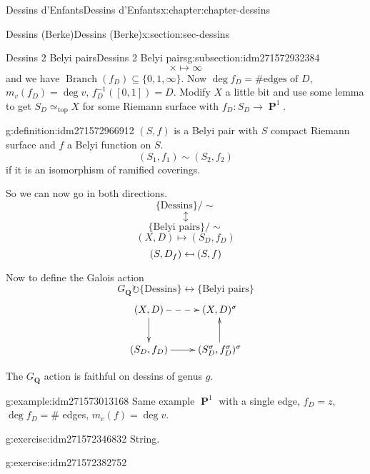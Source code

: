 \documentclass[oneside,10pt,]{book}
\numberwithin{equation}{section}
\newcommand{\lb}{[}
\newcommand{\rb}{]}
\providecommand\mapsfrom{\mathrel{\reflectbox{\ensuremath{\mapsto}}}}
\newcommand{\QQ}{\mathbf{Q}}
\newcommand{\acts}{\circlearrowright}
\DeclareMathOperator{\PP}{\mathbf{P}}
\begin{document}
\begin{chapterptx}{Dessins d'Enfants}{}{Dessins d'Enfants}{}{}{x:chapter:chapter-dessins}
\begin{sectionptx}{Dessins (Berke)}{}{Dessins (Berke)}{}{}{x:section:sec-dessins}
\begin{subsectionptx}{Dessins 2 Belyi pairs}{}{Dessins 2 Belyi pairs}{}{}{g:subsection:idm271572932384}
\begin{equation*}
\times \mapsto\infty
\end{equation*}
and we have \(\operatorname{Branch}(f_D) \subseteq \{0,1,\infty\}\). Now \(\deg f_D = \#\text{edges of }D\), \(m_v(f_D) = \deg v\), \(f_D^{-1}(\lb 0 , 1 \rb) = D\). Modify \(X\) a little bit and use some lemma to get \(S_D \simeq_{\text{top}} X\) for some Riemann surface with \(f_D\colon S_D \to \PP^1\).%
\begin{definition}{}{g:definition:idm271572966912}%
\((S,f)\) is a Belyi pair with \(S\) compact Riemann surface and  \(f\) a Belyi function on \(S\).%
\begin{equation*}
(S_1,f_1) \sim (S_2, f_2)
\end{equation*}
if it is an isomorphism of ramified coverings.%
\end{definition}
So we can now go in both directions.%
\begin{equation*}
\{\text{Dessins}\}/\sim
\end{equation*}
%
\begin{equation*}
\updownarrow
\end{equation*}
%
\begin{equation*}
\{\text{Belyi pairs}\}/\sim
\end{equation*}
%
\begin{equation*}
(X,D) \mapsto (S_D, f_D)
\end{equation*}
%
\begin{equation*}
(S, D_f) \mapsfrom (S,f)
\end{equation*}
%
\par
Now to define the Galois action%
\begin{equation*}
G_\QQ\acts \{\text{Dessins}\}\leftrightarrow \{\text{Belyi pairs}\}
\end{equation*}
%
\begin{equation*}
\xymatrix{
(X,D)\ar[d] \ar@{-->}[r] & (X,D)^\sigma \\
(S_D,f_D)\ar[r] & (S_D^\sigma,f_D^\sigma)^\sigma \ar[u]
}
\end{equation*}
%
\par
The \(G_\QQ\) action is faithful on dessins of genus \(g\).%
\begin{example}{}{g:example:idm271573013168}%
Same example \(\PP^1\) with a single edge, \(f_D  = z\), \(\deg f_D = \#\) edges, \(m_v(f)=  \deg v\).%
\end{example}
\begin{inlineexercise}{}{g:exercise:idm271572346832}%
String.%
\end{inlineexercise}
\begin{inlineexercise}{}{g:exercise:idm271572382752}%

\end{inlineexercise}
\end{subsectionptx}
\end{sectionptx}
\end{chapterptx}
\end{document}

